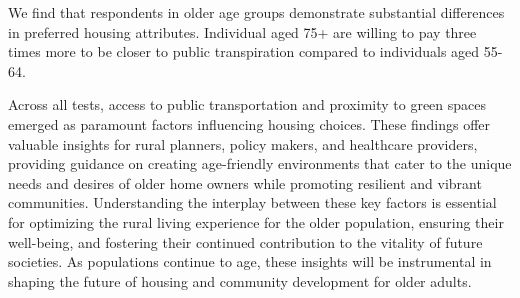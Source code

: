 \documentclass[3p,12pt ]{elsarticle}
\begin{document}
We find that respondents in older age groups demonstrate substantial differences in preferred housing attributes.
Individual aged 75+ are willing to pay three times more to be closer to public transpiration compared to individuals aged 55-64.


Across all tests, access to public transportation and proximity to green spaces emerged as paramount factors influencing housing choices. These findings offer valuable insights for rural planners, policy makers, and healthcare providers, providing guidance on creating age-friendly environments that cater to the unique needs and desires of older home owners while promoting resilient and vibrant communities. Understanding the interplay between these key factors is essential for optimizing the rural living experience for the older population, ensuring their well-being, and fostering their continued contribution to the vitality of future societies. As populations continue to age, these insights will be instrumental in shaping the future of housing and community development for older adults.

\newpage


\pagebreak




\end{document}
